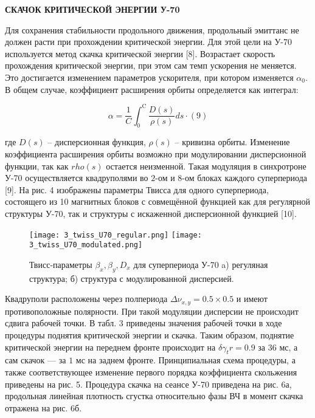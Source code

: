 \textbf{СКАЧОК КРИТИЧЕСКОЙ ЭНЕРГИИ У-70}

\par Для сохранения стабильности продольного движения, продольный эмиттанс не должен расти при прохождении критической энергии. Для этой цели на У-70 используется метод скачка критической энергии [8]. Возрастает скорость прохождения критической энергии, при этом сам темп ускорения не меняется. Это достигается изменением параметров ускорителя, при котором изменяется $\alpha_0$. В общем случае, коэффициент расширения орбиты определяется как интеграл:

\begin{equation}
\alpha=\frac{1}{C} \int_0^{\mathrm{C}} \frac{D(s)}{\rho(s)} d s \cdot(9)
\label{eq:alpha_general}
\end{equation}

\noindent где $D\left(s\right)$ – дисперсионная функция, $\rho\left(s\right)$ – кривизна орбиты. Изменение коэффициента расширения орбиты возможно при модулировании дисперсионной функции, так как $rho\left(s\right)$ остается неизменной. Такая модуляция в синхротроне У-70 осуществляется квадруполями во $2$-ом и $8$-ом блоках каждого суперпериода [9]. На рис. 4 изображены параметры Твисса для одного суперпериода, состоящего из 10 магнитных блоков с совмещённой функцией как для регулярной структуры У-70, так и структуры с искаженной дисперсионной функцией [10].

\begin{figure}
   \texttt{[image: 3\_twiss\_U70\_regular.png]}
   \texttt{[image: 3\_twiss\_U70\_modulated.png]}
   \caption{Твисс-параметры $\beta_x,\beta_y, D_x$ для суперпериода У-70 a) регуляная структура; б) структура с модулированной дисперсией.}
   \label{fig:3_twiss_U70}
\end{figure}

\par Квадруполи расположены через полпериода $\Delta\nu_{x,y}=0.5\times0.5$ и имеют противоположные полярности. При такой модуляции дисперсии не происходит сдвига рабочей точки. В табл. 3 приведены значения рабочей точки в ходе процедуры поднятия критической энергии и скачка. Таким образом, поднятие критической энергии на переднем фронте происходит на $\delta \gamma_tr=0.9$ за $36$ мс, а сам скачок — за $1$ мс на заднем фронте. Принципиальная схема процедуры, а также соответствующее изменение первого порядка коэффициента скольжения приведены на рис. 5. Процедура скачка на сеансе У-70 приведена на рис. 6а, продольная линейная плотность сгустка относительно фазы ВЧ в момент скачка отражена на рис. 6б.

